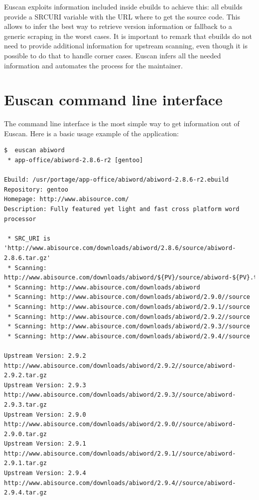 Euscan exploits information included inside ebuilds to achieve this: all ebuilds provide a SRC\textunderscore URI variable with the URL where to get the source code. This allows to infer the best way to retrieve version information or fallback to a generic scraping in the worst cases.
It is important to remark that ebuilds do not need to provide additional information for upstream scanning, even though it is possible to do that to handle corner cases. Euscan infers all the needed information and automates the process for the maintainer.


\section{Euscan command line interface}
The command line interface is the most simple way to get information out of Euscan. Here is a basic usage example of the application:

\vspace{0.5cm}
\lstset{caption=Example of Euscan usage, label=Euscan example, numbers=none, frame=none, breaklines=true}
\begin{lstlisting}
$  euscan abiword
 * app-office/abiword-2.8.6-r2 [gentoo]

Ebuild: /usr/portage/app-office/abiword/abiword-2.8.6-r2.ebuild
Repository: gentoo
Homepage: http://www.abisource.com/
Description: Fully featured yet light and fast cross platform word processor

 * SRC_URI is 'http://www.abisource.com/downloads/abiword/2.8.6/source/abiword-2.8.6.tar.gz'
 * Scanning: http://www.abisource.com/downloads/abiword/${PV}/source/abiword-${PV}.tar.gz
 * Scanning: http://www.abisource.com/downloads/abiword
 * Scanning: http://www.abisource.com/downloads/abiword/2.9.0//source
 * Scanning: http://www.abisource.com/downloads/abiword/2.9.1//source
 * Scanning: http://www.abisource.com/downloads/abiword/2.9.2//source
 * Scanning: http://www.abisource.com/downloads/abiword/2.9.3//source
 * Scanning: http://www.abisource.com/downloads/abiword/2.9.4//source

Upstream Version: 2.9.2  http://www.abisource.com/downloads/abiword/2.9.2//source/abiword-2.9.2.tar.gz
Upstream Version: 2.9.3  http://www.abisource.com/downloads/abiword/2.9.3//source/abiword-2.9.3.tar.gz
Upstream Version: 2.9.0  http://www.abisource.com/downloads/abiword/2.9.0//source/abiword-2.9.0.tar.gz
Upstream Version: 2.9.1  http://www.abisource.com/downloads/abiword/2.9.1//source/abiword-2.9.1.tar.gz
Upstream Version: 2.9.4  http://www.abisource.com/downloads/abiword/2.9.4//source/abiword-2.9.4.tar.gz
\end{lstlisting}
\vspace{0.5cm}


